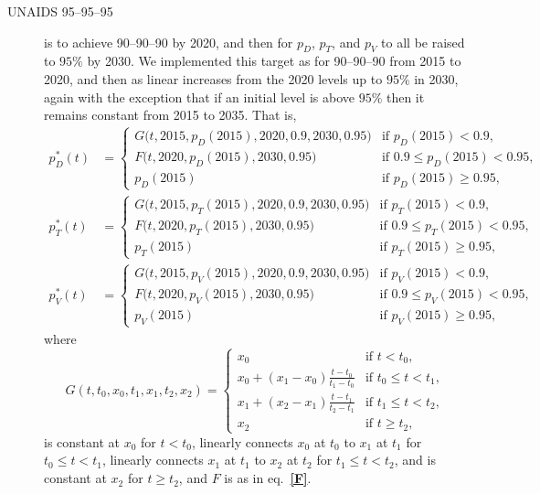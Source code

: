 \documentclass{article}
\renewcommand{\eqref}[1]{\textbf{\ref{#1}}}
\begin{document}
\begin{description}
\item[UNAIDS 95--95--95] is to achieve 90--90--90 by 2020, and then
  for $p_D$, $p_T$, and $p_V$ to all be raised to $95\%$ by 2030.  We
  implemented this target as for 90--90--90 from 2015 to 2020, and
  then as linear increases from the 2020 levels up to $95\%$ in 2030,
  again with the exception that if an initial level is above $95\%$
  then it remains constant from 2015 to 2035.  That is,
  \begin{equation}
    \label{unaids95_targets}
    \begin{split}
      p_D^*(t) &=
      \begin{cases}
        G\big(t, 2015, p_D(2015), 2020, 0.9, 2030, 0.95\big)
        & \text{if $p_D(2015) < 0.9$},
        \\
        F\big(t, 2020, p_D(2015), 2030, 0.95\big)
        & \text{if $0.9 \leq p_D(2015) < 0.95$},
        \\
        p_D(2015) & \text{if $p_D(2015) \geq 0.95$},
      \end{cases}
      \\
      p_T^*(t) &=
      \begin{cases}
        G\big(t, 2015, p_T(2015), 2020, 0.9, 2030, 0.95\big)
        & \text{if $p_T(2015) < 0.9$},
        \\
        F\big(t, 2020, p_T(2015), 2030, 0.95\big)
        & \text{if $0.9 \leq p_T(2015) < 0.95$},
        \\
        p_T(2015) & \text{if $p_T(2015) \geq 0.95$},
      \end{cases}
      \\
      p_V^*(t) &=
      \begin{cases}
        G\big(t, 2015, p_V(2015), 2020, 0.9, 2030, 0.95\big)
        & \text{if $p_V(2015) < 0.9$},
        \\
        F\big(t, 2020, p_V(2015), 2030, 0.95\big)
        & \text{if $0.9 \leq p_V(2015) < 0.95$},
        \\
        p_V(2015) & \text{if $p_V(2015) \geq 0.95$},
      \end{cases}
    \end{split}
  \end{equation}
  where
  \begin{equation}
    G(t, t_0, x_0, t_1, x_1, t_2, x_2) =
    \begin{cases}
      x_0 & \text{if $t < t_0$},
      \\
      x_0 + (x_1 - x_0) \frac{t - t_0}{t_1 - t_0} &
      \text{if $t_0 \leq t < t_1$},
      \\
      x_1 + (x_2 - x_1) \frac{t - t_1}{t_2 - t_1} &
      \text{if $t_1 \leq t < t_2$},
      \\
      x_2 & \text{if $t \geq t_2$},
    \end{cases}
  \end{equation}
  is constant at $x_0$ for $t < t_0$, linearly connects $x_0$ at $t_0$
  to $x_1$ at $t_1$ for $t_0 \leq t < t_1$, linearly connects $x_1$ at
  $t_1$ to $x_2$ at $t_2$ for $t_1 \leq t < t_2$, and is constant at
  $x_2$ for $t \geq t_2$, and $F$ is as in eq.~\eqref{F}.

\end{description}
\end{document}
